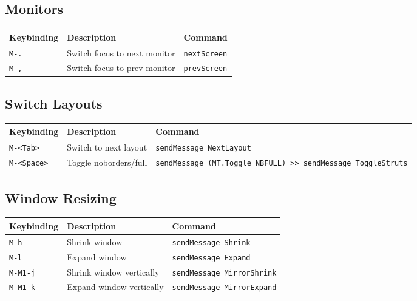 \hypertarget{monitors}{%
\subsection{Monitors}\label{monitors}}

\begin{longtable}[]{@{}lll@{}}
\toprule
Keybinding & Description & Command \\
\midrule
\endhead
\texttt{M-.} & Switch focus to next monitor & \texttt{nextScreen} \\
\texttt{M-,} & Switch focus to prev monitor & \texttt{prevScreen} \\
\bottomrule
\end{longtable}

\hypertarget{switch-layouts}{%
\subsection{Switch Layouts}\label{switch-layouts}}

\begin{longtable}[]{@{}
  >{\raggedright\arraybackslash}p{}
  >{\raggedright\arraybackslash}p{}
  >{\raggedright\arraybackslash}p{}@{}}
\toprule
Keybinding & Description & Command \\
\midrule
\endhead
\texttt{M-\textless{}Tab\textgreater{}} & Switch to next layout &
\texttt{sendMessage\ NextLayout} \\
\texttt{M-\textless{}Space\textgreater{}} & Toggle noborders/full &
\texttt{sendMessage\ (MT.Toggle\ NBFULL)\ \textgreater{}\textgreater{}\ sendMessage\ ToggleStruts} \\
\bottomrule
\end{longtable}

\hypertarget{window-resizing}{%
\subsection{Window Resizing}\label{window-resizing}}

\begin{longtable}[]{@{}lll@{}}
\toprule
Keybinding & Description & Command \\
\midrule
\endhead
\texttt{M-h} & Shrink window & \texttt{sendMessage\ Shrink} \\
\texttt{M-l} & Expand window & \texttt{sendMessage\ Expand} \\
\texttt{M-M1-j} & Shrink window vertically &
\texttt{sendMessage\ MirrorShrink} \\
\texttt{M-M1-k} & Expand window vertically &
\texttt{sendMessage\ MirrorExpand} \\
\bottomrule
\end{longtable}

